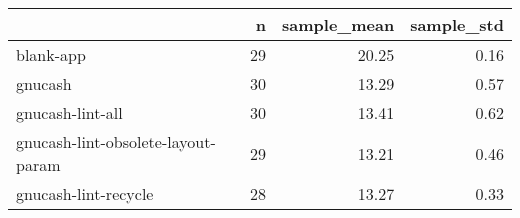 \begin{tabular}{lrrr}
\toprule
{} &   n &  sample\_mean &  sample\_std \\
\midrule
blank-app                          &  29 &        20.25 &        0.16 \\
gnucash                            &  30 &        13.29 &        0.57 \\
gnucash-lint-all                   &  30 &        13.41 &        0.62 \\
gnucash-lint-obsolete-layout-param &  29 &        13.21 &        0.46 \\
gnucash-lint-recycle               &  28 &        13.27 &        0.33 \\
\bottomrule
\end{tabular}
